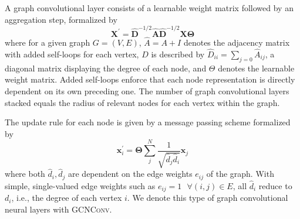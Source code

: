 \documentclass[]{article}
\renewcommand{\cite}{\citep}
\begin{document}
A graph convolutional layer \cite{GCNConv} consists of a learnable
weight matrix followed by an aggregation step, formalized by
\begin{equation}
	\mathbf{X}^{\prime} = \mathbf{\hat{D}}^{-1/2} \mathbf{\hat{A}}
	\mathbf{\hat{D}}^{-1/2} \mathbf{X} \mathbf{\Theta}
\end{equation}
where for a given graph $G=(V,E)$, $\hat{A} = A + I$ denotes the
adjacency matrix with added self-loops for each vertex, $D$ is
described by $\hat{D}_{ii} = \sum_{j=0} \hat{A}_{ij}$, a diagonal
matrix displaying the degree of each node, and $\Theta$ denotes the
learnable weight matrix. Added self-loops enforce that each node
representation is directly dependent on its own preceding one. The
number of graph convolutional layers stacked equals the radius of
relevant nodes for each vertex within the graph.

The update rule for each node is given by a message passing scheme
formalized by
\begin{equation}
	\mathbf{x}^{\prime}_i = \mathbf{\Theta} \sum^{N}_{j}
	\frac{1}{\sqrt{\hat{d}_j \hat{d}_i}} \mathbf{x}_j
\end{equation}
where both $\hat{d}_i, \hat{d}_j$ are dependent on the edge weights
$e_{ij}$ of the graph. With simple, single-valued edge weights such as
$e_{ij}=1 \text{ }\forall (i,j)\in E$, all $\hat{d}_i$ reduce to
$d_i$, i.e., the degree of each vertex $i$. We denote this type of
graph convolutional neural layers with \textsc{GCNConv}.
\end{document}
